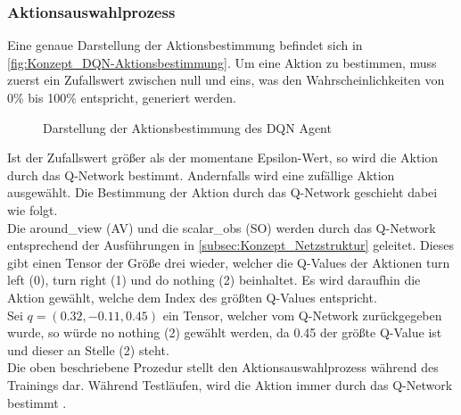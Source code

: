 \subsubsection{Aktionsauswahlprozess} \label{subsubsec:Konzept_Aktionsauswahlprozess_DQN}
Eine genaue Darstellung der Aktionsbestimmung befindet sich in \autoref{fig:Konzept_DQN-Aktionsbestimmung}. Um eine Aktion zu bestimmen, muss zuerst ein Zufallswert zwischen null und eins, was den Wahrscheinlichkeiten von 0\% bis 100\% entspricht, generiert werden.
\begin{figure}[H]
	\centering
	
	\caption[DQN Aktionsbestimmung]{Darstellung der Aktionsbestimmung des DQN Agent}
	\label{fig:Konzept_DQN-Aktionsbestimmung}
\end{figure}
Ist der Zufallswert größer als der momentane Epsilon-Wert, so wird die Aktion durch das Q-Network bestimmt. Andernfalls wird eine zufällige Aktion ausgewählt. Die Bestimmung der Aktion durch das Q-Network geschieht dabei wie folgt.\\
Die around\_view (AV) und die scalar\_obs (SO) werden durch das Q-Network entsprechend der Ausführungen in \autoref{subsec:Konzept_Netzstruktur} geleitet. Dieses gibt einen Tensor der Größe drei wieder, welcher die Q-Values der Aktionen turn left (0), turn right (1) und do nothing (2) beinhaltet.
Es wird daraufhin die Aktion gewählt, welche dem Index des größten Q-Values entspricht.\\
Sei $q = (0.32, -0.11, 0.45)$ ein Tensor, welcher vom Q-Network zurückgegeben wurde, so würde no nothing (2) gewählt werden, da 0.45 der größte Q-Value ist und dieser an Stelle (2) steht.\\
Die oben beschriebene Prozedur stellt den Aktionsauswahlprozess während des Trainings dar. Während Testläufen, wird die Aktion immer durch das Q-Network bestimmt .

